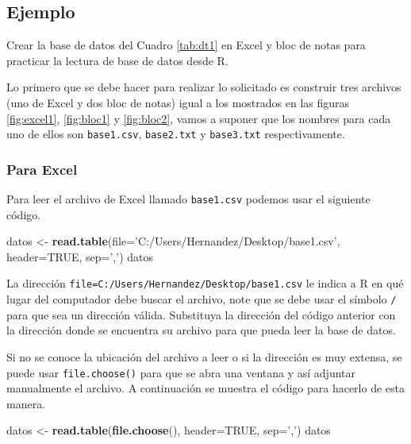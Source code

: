 \documentclass[10pt,]{krantz}
\makeatletter
\newenvironment{Shaded}{\begin{snugshade}}{\end{snugshade}}
\newcommand{\KeywordTok}[1]{\textcolor[rgb]{0.13,0.29,0.53}{\textbf{{#1}}}}
\newcommand{\DataTypeTok}[1]{\textcolor[rgb]{0.13,0.29,0.53}{{#1}}}
\newcommand{\StringTok}[1]{\textcolor[rgb]{0.31,0.60,0.02}{{#1}}}
\newcommand{\OtherTok}[1]{\textcolor[rgb]{0.56,0.35,0.01}{{#1}}}
\newcommand{\NormalTok}[1]{{#1}}
\let\proglang=\textsf
\newenvironment{kframe}{%
\medskip{}
\setlength{\fboxsep}{.8em}
 \def\at@end@of@kframe{}%
 \ifinner\ifhmode%
  \def\at@end@of@kframe{\end{minipage}}%
  \begin{minipage}{\columnwidth}%
 \fi\fi%
 \def\FrameCommand##1{\hskip\@totalleftmargin \hskip-\fboxsep
 \colorbox{shadecolor}{##1}\hskip-\fboxsep
     \hskip-\linewidth \hskip-\@totalleftmargin \hskip\columnwidth}%
 \MakeFramed {\advance\hsize-\width
   \@totalleftmargin\z@ \linewidth\hsize
   \@setminipage}}%
 {\par\unskip\endMakeFramed%
 \at@end@of@kframe}
\renewenvironment{Shaded}{\begin{kframe}}{\end{kframe}}
\makeatother
\begin{document}
\subsection*{Ejemplo}\label{ejemplo-24}


Crear la base de datos del Cuadro \ref{tab:dt1} en Excel y bloc de notas
para practicar la lectura de base de datos desde \proglang{R}.

Lo primero que se debe hacer para realizar lo solicitado es construir
tres archivos (uno de Excel y dos bloc de notas) igual a los mostrados
en las figuras \ref{fig:excel1}, \ref{fig:bloc1} y \ref{fig:bloc2},
vamos a suponer que los nombres para cada uno de ellos son
\texttt{base1.csv}, \texttt{base2.txt} y \texttt{base3.txt}
respectivamente.

\subsubsection*{Para Excel}\label{para-excel}


Para leer el archivo de Excel llamado \texttt{base1.csv} podemos usar el
siguiente código.

\begin{Shaded}
\begin{Highlighting}[]
\NormalTok{datos <-}\StringTok{ }\KeywordTok{read.table}\NormalTok{(}\DataTypeTok{file=}\StringTok{'C:/Users/Hernandez/Desktop/base1.csv'}\NormalTok{,}
                    \DataTypeTok{header=}\OtherTok{TRUE}\NormalTok{, }\DataTypeTok{sep=}\StringTok{','}\NormalTok{)}
\NormalTok{datos}
\end{Highlighting}
\end{Shaded}

La dirección
\texttt{file=\textquotesingle{}C:/Users/Hernandez/Desktop/base1.csv\textquotesingle{}}
le indica a \proglang{R} en qué lugar del computador debe buscar el
archivo, note que se debe usar el símbolo \texttt{/} para que sea un
dirección válida. Substituya la dirección del código anterior con la
dirección donde se encuentra su archivo para que pueda leer la base de
datos.

Si no se conoce la ubicación del archivo a leer o si la dirección es muy
extensa, se puede usar \texttt{file.choose()} para que se abra una
ventana y así adjuntar manualmente el archivo. A continuación se muestra
el código para hacerlo de esta manera.

\begin{Shaded}
\begin{Highlighting}[]
\NormalTok{datos <-}\StringTok{ }\KeywordTok{read.table}\NormalTok{(}\KeywordTok{file.choose}\NormalTok{(), }\DataTypeTok{header=}\OtherTok{TRUE}\NormalTok{, }\DataTypeTok{sep=}\StringTok{','}\NormalTok{)}
\NormalTok{datos}
\end{Highlighting}
\end{Shaded}
\end{document}
